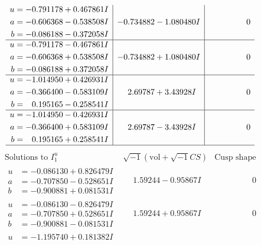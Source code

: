 \documentclass[1p]{elsarticle_modified}
\theoremstyle{definition}
\newcommand{\I}{\sqrt{-1}}
\begin{document}
$$\begin{array}{c|c|c}
\begin{aligned}
u &= -0.791178 + 0.467861 I \\
a &= -0.606368 - 0.538508 I \\
b &= -0.086188 - 0.372058 I\end{aligned}
 & -0.734882 - 1.080480 I & \phantom{-0.000000 } 0 \\ \hline\begin{aligned}
u &= -0.791178 - 0.467861 I \\
a &= -0.606368 + 0.538508 I \\
b &= -0.086188 + 0.372058 I\end{aligned}
 & -0.734882 + 1.080480 I & \phantom{-0.000000 } 0 \\ \hline\begin{aligned}
u &= -1.014950 + 0.426931 I \\
a &= -0.366400 - 0.583109 I \\
b &= \phantom{-}0.195165 - 0.258541 I\end{aligned}
 & \phantom{-}2.69787 + 3.43928 I & \phantom{-0.000000 } 0 \\ \hline\begin{aligned}
u &= -1.014950 - 0.426931 I \\
a &= -0.366400 + 0.583109 I \\
b &= \phantom{-}0.195165 + 0.258541 I\end{aligned}
 & \phantom{-}2.69787 - 3.43928 I & \phantom{-0.000000 } 0\\
 \hline 
 \end{array}$$\newpage$$\begin{array}{c|c|c}  
\text{Solutions to }I^u_{1}& \I (\text{vol} + \sqrt{-1}CS) & \text{Cusp shape}\\
 \hline 
\begin{aligned}
u &= -0.086130 + 0.826479 I \\
a &= -0.707850 - 0.528651 I \\
b &= -0.900881 + 0.081531 I\end{aligned}
 & \phantom{-}1.59244 - 0.95867 I & \phantom{-0.000000 } 0 \\ \hline\begin{aligned}
u &= -0.086130 - 0.826479 I \\
a &= -0.707850 + 0.528651 I \\
b &= -0.900881 - 0.081531 I\end{aligned}
 & \phantom{-}1.59244 + 0.95867 I & \phantom{-0.000000 } 0 \\ \hline\begin{aligned}
u &= -1.195740 + 0.181382 I \\

\end{aligned}
\end{array}$$
\end{document}
